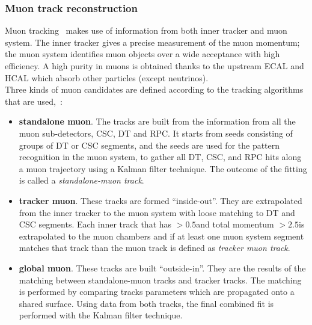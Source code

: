\subsubsection{Muon track reconstruction}\label{sec:c2muonreco}
Muon tracking~\cite{collaboration_2013,Sirunyan_2018_muon} makes use of information from
both inner tracker and muon system. The
inner tracker gives a precise measurement of the muon momentum; the
muon system identifies muon objects over a wide acceptance with high efficiency. A high purity in muons is obtained
thanks to the upstream ECAL and HCAL which absorb other particles
(except neutrinos). \\
Three kinds of muon
candidates are defined according to the tracking algorithms that are used,~\cite{Sirunyan_2018_muon}:
\begin{itemize}
\setlength\itemsep{-0.2em}
\item \textbf{standalone muon}. The tracks are built from the
  information from all the muon sub-detectors, CSC, DT and RPC. It
  starts from seeds consisting of groups of DT or CSC segments, and
  the seeds are used for the pattern recognition in the muon system, to
gather all DT, CSC, and RPC hits along a muon trajectory using a
Kalman filter technique. The outcome of the fitting is called a
\emph{standalone-muon track}.
\item \textbf{tracker muon}. These tracks are formed
  ``inside-out''. They are extrapolated from the inner
  tracker to the muon system with loose matching to DT and CSC
  segments. Each inner track that has \pt$>0.5$\GeV and total
  momentum $>2.5$\GeV is extrapolated to the muon chambers and if at
  least one muon system segment matches that track than the muon track is defined as \emph{tracker
  muon track}. 
\item \textbf{global muon}. These tracks are built
  ``outside-in''. They are the results of the matching between
  standalone-muon tracks and tracker tracks. The matching is performed by
  comparing tracks parameters which are propagated onto a shared
  surface. Using data from both tracks, the final combined fit is performed with the Kalman filter technique.
\end{itemize}

